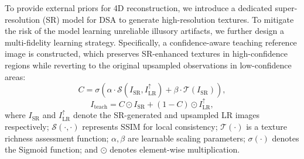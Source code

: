 \documentclass[runningheads]{llncs}
\begin{document}
To provide external priors for 4D reconstruction, we introduce a dedicated super-resolution (SR) model for DSA to generate high-resolution textures. To mitigate the risk of the model learning unreliable illusory artifacts, we further design a multi-fidelity learning strategy. Specifically, a confidence-aware teaching reference image is constructed, which preserves SR-enhanced textures in high-confidence regions while reverting to the original upsampled observations in low-confidence areas:
\begin{equation}
C = \sigma\left(\alpha \cdot \mathcal{S}(I_{\text{SR}}, I_{\text{LR}}^{\uparrow}) + \beta \cdot \mathcal{T}(I_{\text{SR}})\right),
\end{equation}
\begin{equation}
I_{\text{teach}} = C \odot I_{\text{SR}} + (1 - C) \odot I_{\text{LR}}^{\uparrow},
\end{equation}
where $I_{\text{SR}}$ and $I_{\text{LR}}^{\uparrow}$ denote the SR-generated and upsampled LR images respectively; $\mathcal{S}(\cdot,\cdot)$ represents SSIM for local consistency; $\mathcal{T}(\cdot)$ is a texture richness assessment function; $\alpha, \beta$ are learnable scaling parameters; $\sigma(\cdot)$ denotes the Sigmoid function; and $\odot$ denotes element-wise multiplication.
\end{document}
